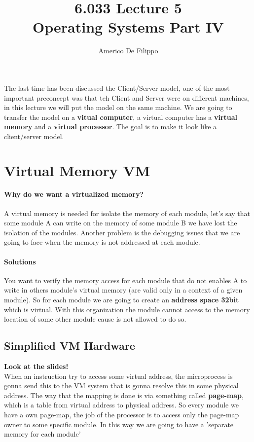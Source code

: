 \documentclass{article}
\title{6.033 Lecture 5 \\ Operating Systems Part IV}
\author{Americo De Filippo}
\begin{document}
 
  \maketitle
  The last time has been discussed the Client/Server model, one of the 
  most important preconcept was that teh Client and Server were on different
  machines, in this lecture we will put the model on the same machine. We are 
  going to transfer the model on a \textbf{vitual computer}, a virtual computer
  has a \textbf{virtual memory} and a \textbf{virtual processor}. The goal is to
  make it look like a client/server model.
  \section{Virtual Memory VM}
    \paragraph{Why do we want a virtualized memory?} A virtual memory is needed for isolate 
      the memory of each module, let's say that some module A can write on the memory of some 
      module B we have lost the isolation of the modules. Another problem is the debugging 
      issues that we are going to face when the memory is not addressed at each module.
    \paragraph{Solutions} You want to verify the memory access for each module that do not
      enables A to write in others module's virtual memory (are valid only in a context of 
      a given module). So for each module we are going to create an \textbf{address space 32bit} 
      which is virtual. With this organization the module cannot access to the memory location
      of some other module cause is not allowed to do so.
    \subsection{Simplified VM Hardware} \textbf{Look at the slides!} \\ When an instruction try to 
      access some virtual address, the microprocess is gonna send this to the VM system
      that is gonna resolve this in some physical address. The way that the mapping is done
      is via something called \textbf{page-map}, which is a table from virtual address 
      to physical address. So every module we have a own page-map, the job of the processor
      is to access only the page-map owner to some specific module. In this way we are going to 
      have a 'separate memory for each module'
\end{document}
